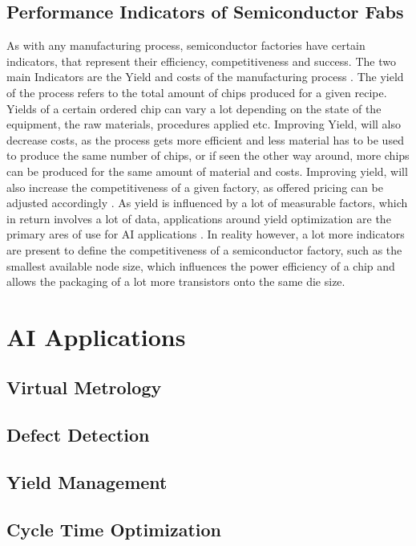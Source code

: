 \documentclass{Academic}
\begin{document}
    \subsection{Performance Indicators of Semiconductor Fabs}
    As with any manufacturing process, semiconductor factories have certain indicators, that represent their efficiency, competitiveness and success. The two main Indicators are the Yield and costs of the manufacturing process \cite{yuan-fu_deep_2019-1,batool_systematic_2021}. The yield of the process refers to the total amount of chips produced for a given recipe. Yields of a certain ordered chip can vary a lot depending on the state of the equipment, the raw materials, procedures applied etc. Improving Yield, will also decrease costs, as the process gets more efficient and less material has to be used to produce the same number of chips, or if seen the other way around, more chips can be produced for the same amount of material and costs. Improving yield, will also increase the competitiveness of a given factory, as offered pricing can be adjusted accordingly \cite{batool_systematic_2021}. As yield is influenced by a lot of measurable factors, which in return involves a lot of data, applications around yield optimization are the primary ares of use for AI applications \cite{jiang_novel_2020}. In reality however, a lot more indicators are present to define the competitiveness of a semiconductor factory, such as the smallest available node size, which influences the power efficiency of a chip and allows the packaging of a lot more transistors onto the same die size.

    \section{AI Applications}

    \subsection{Virtual Metrology}

    \subsection{Defect Detection}

    \subsection{Yield Management}

    \subsection{Cycle Time Optimization}
\end{document}
